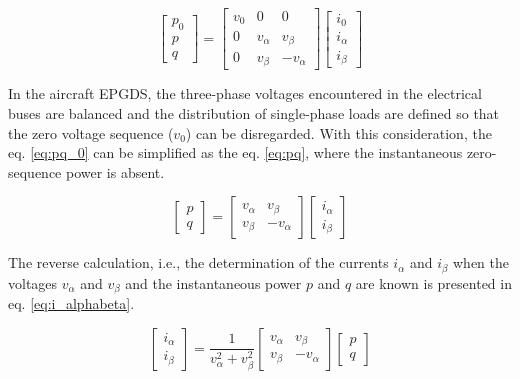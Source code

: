 \begin{equation}
\begin{bmatrix}
p_0\\
p\\
q
\end{bmatrix}=
\begin{bmatrix}
v_0		&	0			&	0\\
0		&	v_{\alpha}	&	v_{\beta}\\
0		&	v_{\beta}	&	-v_{\alpha}
\end{bmatrix}
\begin{bmatrix}
i_{0}\\
i_{\alpha}\\
i_{\beta}
\end{bmatrix}
\label{eq:pq_0}
\end{equation} 

In the aircraft EPGDS, the three-phase voltages encountered in the electrical buses are balanced and the distribution of single-phase loads are defined so that the zero voltage sequence ($v_0$) can be disregarded. With this consideration, the eq. \ref{eq:pq_0} can be simplified as the eq. \ref{eq:pq}, where the instantaneous zero-sequence power is absent.

\begin{equation}
\begin{bmatrix}
p\\
q
\end{bmatrix}=
\begin{bmatrix}
v_{\alpha}	&	v_{\beta}\\
v_{\beta}	&	-v_{\alpha}
\end{bmatrix}
\begin{bmatrix}
i_{\alpha}\\
i_{\beta}
\end{bmatrix}
\label{eq:pq}
\end{equation} 

The reverse calculation, i.e., the determination of the currents $i_{\alpha}$ and $i_{\beta}$ when the voltages $v_{\alpha}$ and $v_{\beta}$ and the instantaneous power $p$ and $q$ are known is presented in eq. \ref{eq:i_alphabeta}.

\begin{equation}
\begin{bmatrix}
i_{\alpha}\\
i_{\beta}
\end{bmatrix}=
\dfrac{1}{v_{\alpha}^2+v_{\beta}^2}
\begin{bmatrix}
v_{\alpha}	&	v_{\beta}\\
v_{\beta}	&	-v_{\alpha}
\end{bmatrix}
\begin{bmatrix}
p\\
q
\end{bmatrix}
\label{eq:i_alphabeta}
\end{equation}

